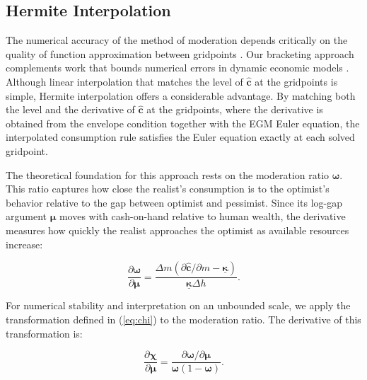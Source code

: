 \documentclass[preprint,authoryear]{elsarticle}
\newcommand{\mNrm}{m}
\newcommand{\cFunc}{\mathbf{c}}
\newcommand{\hNrm}{h}
\newcommand{\MPC}{\boldsymbol{\kappa}}
\newcommand{\MPCmin}{\underline{\MPC}}
\newcommand{\logmNrmEx}{\boldsymbol{\mu}}
\newcommand{\modRte}{\boldsymbol{\omega}}
\newcommand{\mNrmEx}{\Delta \mNrm}
\newcommand{\hNrmEx}{\Delta \hNrm}
\newcommand{\cFuncReal}{\hat{\cFunc}}
\newcommand{\logitModRte}{\boldsymbol{\chi}}
\begin{document}
\subsection{Hermite Interpolation}

The numerical accuracy of the method of moderation depends critically on the quality of function approximation between gridpoints \citep{Santos2000}. Our bracketing approach complements work that bounds numerical errors in dynamic economic models \citep{JuddMaliarMaliar2017}. Although linear interpolation that matches the level of $\cFuncReal$ at the gridpoints is simple, Hermite interpolation \citep{Fritsch1980, FritschButland1984, Hyman1983} offers a considerable advantage. By matching both the level and the derivative of $\cFuncReal$ at the gridpoints, where the derivative is obtained from the envelope condition \citep{BenvenisteScheinkman1979, MilgromSegal2002} together with the EGM Euler equation, the interpolated consumption rule satisfies the Euler equation exactly at each solved gridpoint.

The theoretical foundation for this approach rests on the moderation ratio $\modRte$. This ratio captures how close the realist's consumption is to the optimist's behavior relative to the gap between optimist and pessimist. Since its log-gap argument $\logmNrmEx$ moves with cash-on-hand relative to human wealth, the derivative measures how quickly the realist approaches the optimist as available resources increase:

\begin{equation}
\label{eq:modRteMu}
\frac{\partial \modRte}{\partial \logmNrmEx} = \frac{\mNrmEx (\partial \cFuncReal/\partial \mNrm - \MPCmin)}{\MPCmin \hNrmEx}.
\end{equation}

For numerical stability and interpretation on an unbounded scale, we apply the transformation defined in (\ref{eq:chi}) to the moderation ratio. The derivative of this transformation is:

\begin{equation}
\label{eq:logitModRteMu}
\frac{\partial \logitModRte}{\partial \logmNrmEx} = \frac{\partial \modRte / \partial \logmNrmEx}{\modRte(1 - \modRte)}.
\end{equation}
\end{document}

